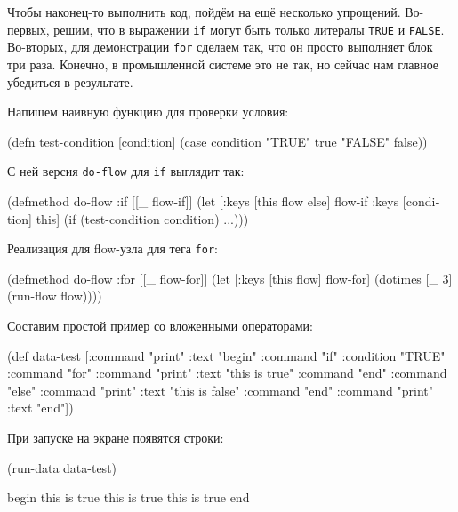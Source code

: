 Чтобы наконец-то выполнить код, пойдём на ещё несколько упрощений. Во-первых,
решим, что в выражении \texttt{if} могут быть только литералы \texttt{TRUE} и
\texttt{FALSE}. Во-вторых, для демонстрации \texttt{for} сделаем так, что он
просто выполняет блок три раза. Конечно, в промышленной системе это не так, но
сейчас нам главное убедиться в результате.

Напишем наивную функцию для проверки условия:

\begin{english}
  \begin{clojure}
(defn test-condition [condition]
  (case condition
    "TRUE" true
    "FALSE" false))
  \end{clojure}
\end{english}

С ней версия \texttt{do-flow} для \texttt{if} выглядит так:

\begin{english}
  \begin{clojure}
(defmethod do-flow :if
  [[_ flow-if]]
  (let [{:keys [this flow else]} flow-if
        {:keys [condition]} this]
    (if (test-condition condition)
      ...)))
  \end{clojure}
\end{english}

Реализация для flow-узла для тега \texttt{for}:

\begin{english}
  \begin{clojure}
(defmethod do-flow :for
  [[_ flow-for]]
  (let [{:keys [this flow]} flow-for]
    (dotimes [_ 3]
      (run-flow flow))))
  \end{clojure}
\end{english}

Составим простой пример со вложенными операторами:

\begin{english}
  \begin{clojure}
(def data-test
  [{:command "print" :text "begin"}
   {:command "if" :condition "TRUE"}
     {:command "for"}
       {:command "print" :text "this is true"}
     {:command "end"}
   {:command "else"}
     {:command "print" :text "this is false"}
   {:command "end"}
   {:command "print" :text "end"}])
  \end{clojure}
\end{english}

При запуске на экране появятся строки:

\begin{english}
  \begin{clojure}
(run-data data-test)

begin
this is true
this is true
this is true
end
  \end{clojure}
\end{english}

